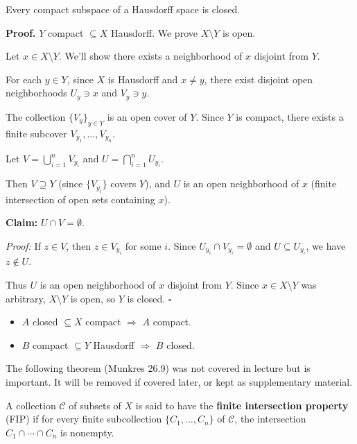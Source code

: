 \documentclass[11pt]{report}
\renewenvironment{proof}[1][Proof]{\noindent\textbf{#1.} }{\hfill$\square$\par\vspace{5pt}}
\begin{document}
\begin{thmbox}
Every compact subspace of a Hausdorff space is closed.
\end{thmbox}

\begin{proof}
$Y$ compact $\subseteq X$ Hausdorff. We prove $X \setminus Y$ is open.

Let $x \in X \setminus Y$. We'll show there exists a neighborhood of $x$ disjoint from $Y$.

For each $y \in Y$, since $X$ is Hausdorff and $x \neq y$, there exist disjoint open neighborhoods $U_y \ni x$ and $V_y \ni y$.

The collection $\{V_y\}_{y \in Y}$ is an open cover of $Y$. Since $Y$ is compact, there exists a finite subcover $V_{y_1}, \ldots, V_{y_n}$.

Let $V = \bigcup_{i=1}^{n} V_{y_i}$ and $U = \bigcap_{i=1}^{n} U_{y_i}$.

Then $V \supseteq Y$ (since $\{V_{y_i}\}$ covers $Y$), and $U$ is an open neighborhood of $x$ (finite intersection of open sets containing $x$).

\textbf{Claim:} $U \cap V = \emptyset$.

\textit{Proof:} If $z \in V$, then $z \in V_{y_i}$ for some $i$. Since $U_{y_i} \cap V_{y_i} = \emptyset$ and $U \subseteq U_{y_i}$, we have $z \notin U$.

Thus $U$ is an open neighborhood of $x$ disjoint from $Y$. Since $x \in X \setminus Y$ was arbitrary, $X \setminus Y$ is open, so $Y$ is closed.
\end{proof}

\begin{rembox}
\begin{itemize}
    \item $A$ closed $\subseteq X$ compact $\Rightarrow$ $A$ compact.
    \item $B$ compact $\subseteq Y$ Hausdorff $\Rightarrow$ $B$ closed.
\end{itemize}
\end{rembox}

\begin{rembox}
The following theorem (Munkres 26.9) was not covered in lecture but is important. It will be removed if covered later, or kept as supplementary material.
\end{rembox}

\begin{defbox}
A collection $\mathcal{C}$ of subsets of $X$ is said to have the \textbf{finite intersection property} (FIP) if for every finite subcollection $\{C_1, \ldots, C_n\}$ of $\mathcal{C}$, the intersection $C_1 \cap \cdots \cap C_n$ is nonempty.
\end{defbox}
\end{document}
